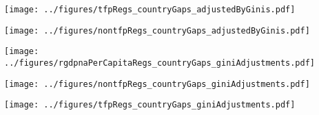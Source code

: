 \documentclass[12pt,english]{article}
\theoremstyle{remark}
\begin{document}
\begin{sidewaysfigure}
	\centering
	\texttt{[image: ../figures/tfpRegs\_countryGaps\_adjustedByGinis.pdf]}
	\caption{} 
\end{sidewaysfigure}

\begin{sidewaysfigure}
	\centering
	\texttt{[image: ../figures/nontfpRegs\_countryGaps\_adjustedByGinis.pdf]}
	\caption{} 
\end{sidewaysfigure}



\begin{sidewaysfigure}
	\centering
	\texttt{[image: ../figures/rgdpnaPerCapitaRegs\_countryGaps\_giniAdjustments.pdf]}
	\caption{} 
\end{sidewaysfigure}

\begin{sidewaysfigure}
	\centering
	\texttt{[image: ../figures/nontfpRegs\_countryGaps\_giniAdjustments.pdf]}
	\caption{} 
\end{sidewaysfigure}

\begin{sidewaysfigure}
	\centering
	\texttt{[image: ../figures/tfpRegs\_countryGaps\_giniAdjustments.pdf]}
	\caption{} 
\end{sidewaysfigure}
\end{document}
